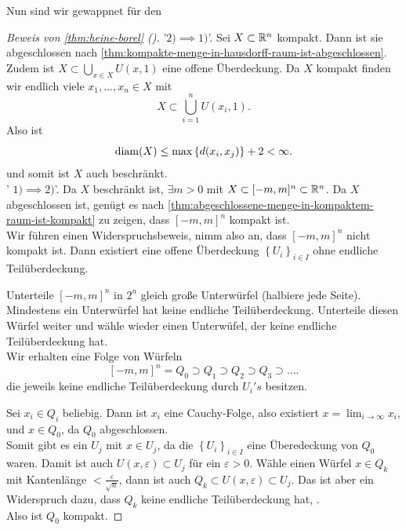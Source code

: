 Nun sind wir gewappnet für den
\begin{proof}[Beweis von \autoref{thm:heine-borel} ()]
    '$2) \implies 1)$'. Sei $X\subset \mathbb{R}^n$ kompakt. Dann ist sie abgeschlossen nach \ref{thm:kompakte-menge-in-hausdorff-raum-ist-abgeschlossen}.
    Zudem ist $X\subset \bigcup_{x\in X} U(x,1)$ eine offene Überdeckung. Da $X$ kompakt finden wir endlich viele  $x_1,\ldots,x_n\in X$ mit
    \[
        X \subset \bigcup_{i=1}^n U(x_i,1)
    .\] 
    Also ist
    \[
        \operatorname{diam}(X) \leq  \max \left \{d(x_i,x_j)\right\} +2 < \infty
    .\] 
    und somit ist $X$ auch beschränkt. \\
    ' $1)\implies 2)$'. Da $X$ beschränkt ist,  $\exists m>0$ mit $X\subset [-m,m]^n\subset \mathbb{R}^n$. Da $X$ abgeschlossen ist, genügt es nach \autoref{thm:abgeschlossene-menge-in-kompaktem-raum-ist-kompakt} zu zeigen, dass  $[-m,m]^n$ kompakt ist. \\
    Wir führen einen Widerspruchsbeweis, nimm also an, dass  $[-m,m]^n$ nicht kompakt ist. Dann existiert eine offene Überdeckung  $\left \{U_i\right\} _{i \in I}$ ohne endliche Teilüberdeckung. \\
    \noindent\begin{minipage}{0.5\textwidth}
    Unterteile $[-m,m]^n$ in  $2^n$ gleich große Unterwürfel (halbiere jede Seite). Mindestens ein Unterwürfel hat keine endliche Teilüberdeckung. Unterteile diesen Würfel weiter und wähle wieder einen Unterwüfel, der keine endliche Teilüberdeckung hat. \\
    Wir erhalten eine Folge von Würfeln
     \[
         [-m,m]^n =     Q_0 \supset Q_1 \supset Q_2 \supset Q_3 \supset \ldots
    .\] 
    die jeweils keine endliche Teilüberdeckung durch $U_i's$ besitzen. \\
    \end{minipage}
    \begin{minipage}{0.5\textwidth}
    \end{minipage}
    Sei  $x_i \in Q_i$ beliebig. Dann ist $x_i$ eine Cauchy-Folge, also existiert $x = \lim_{i\to \infty} x_i$, und $x\in Q_0$, da $Q_0$ abgeschlossen. \\
    Somit gibt es ein $U_j$ mit  $x\in U_j$, da die $\left \{U_i\right\} _{i \in I}$ eine Überedeckung von $Q_0$ waren. Damit ist auch $U(x,ε) \subset U_j$ für ein $ε>0$. Wähle einen Würfel $x\in Q_k$ mit Kantenlänge $< \frac{ε}{\sqrt{n} }$, dann ist auch $Q_k \subset U(x,ε) \subset U_j$. Das ist aber ein Widerspruch dazu, dass $Q_k$ keine endliche Teilüberdeckung hat, \contra. \\
    Also ist  $Q_0$ kompakt.
\end{proof}



